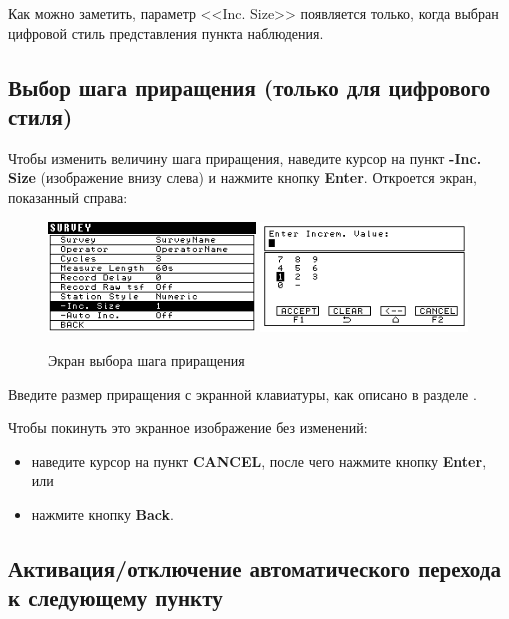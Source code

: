Как можно заметить, параметр <<Inc. Size>> появляется только, когда выбран
цифровой стиль представления пункта наблюдения.

\subsection{Выбор шага приращения (только для цифрового стиля)}

Чтобы изменить величину шага приращения, наведите курсор на пункт \textbf{-Inc.
  Size} (изображение внизу слева) и нажмите кнопку \textbf{Enter}. Откроется
экран, показанный справа:

\begin{figure}[H]
  \centering
  \includegraphics[width=0.49\textwidth]{figures/the_increment_size_screen_1}
  \includegraphics[width=0.49\textwidth]{figures/the_increment_size_screen_2}
  \caption{Экран выбора шага приращения}
  \label{fig:the_increment_size_screen}
\end{figure}

Введите размер приращения с экранной клавиатуры, как описано в разделе
.

Чтобы покинуть это экранное изображение без изменений:
\begin{itemize}
  \item наведите курсор на пункт \textbf{CANCEL}, после чего нажмите кнопку
    \textbf{Enter}, или

  \item нажмите кнопку \textbf{Back}.
\end{itemize}

\subsection{Активация/отключение автоматического перехода к следующему пункту}

